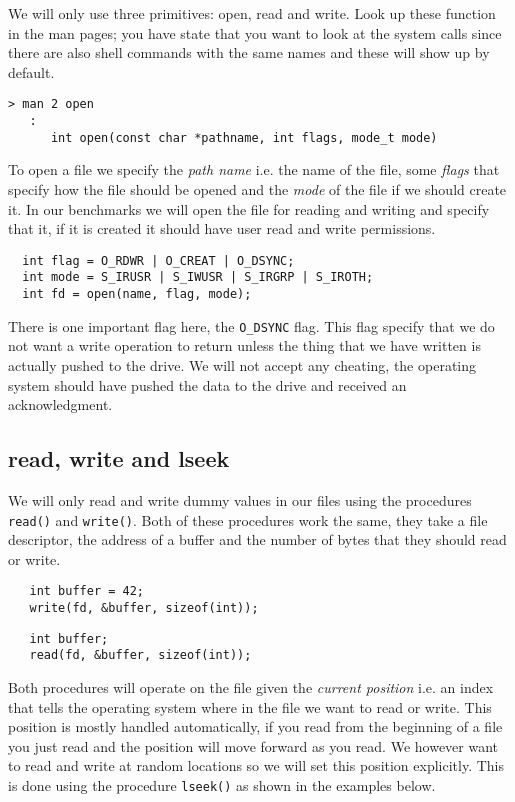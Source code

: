 \documentclass[a4paper,11pt]{article}
\begin{document}
We will only use three primitives: open, read and write. Look up these
function in the man pages; you have state that you want to look at the
system calls since there are also shell commands with the same names
and these will show up by default.

\begin{verbatim}
> man 2 open
   :
      int open(const char *pathname, int flags, mode_t mode)
\end{verbatim}


To open a file we specify the {\em path name} i.e. the name of the
file, some {\em flags} that specify how the file should be opened and
the {\em mode} of the file if we should create it. In our benchmarks
we will open the file for reading and writing and specify that it, if
it is created it should have user read and write permissions.

\begin{lstlisting}
  int flag = O_RDWR | O_CREAT | O_DSYNC;  
  int mode = S_IRUSR | S_IWUSR | S_IRGRP | S_IROTH;
  int fd = open(name, flag, mode);
\end{lstlisting}

There is one important flag here, the {\tt O\_DSYNC}
flag. This flag specify that we do not want a write operation to
return unless the thing that we have written is actually pushed to the
drive. We will not accept any cheating, the operating system should
have pushed the data to the drive and received an acknowledgment. 

\subsection*{read, write and lseek}

We will only read and write dummy values in our files using the
procedures {\tt read()} and {\tt write()}. Both of these procedures
work the same, they take a file descriptor, the address of a buffer
and the number of bytes that they should read or write.

\begin{lstlisting}
   int buffer = 42;
   write(fd, &buffer, sizeof(int));  
\end{lstlisting}

\begin{lstlisting}
   int buffer;
   read(fd, &buffer, sizeof(int));  
\end{lstlisting}

Both procedures will operate on the file given the {\em current
  position} i.e. an index that tells the operating system where in the
file we want to read or write. This position is mostly handled
automatically, if you read from the beginning of a file you just read
and the position will move forward as you read. We however want to
read and write at random locations so we will set this position
explicitly. This is done using the procedure {\tt lseek()} as shown in
the examples below.
\end{document}
